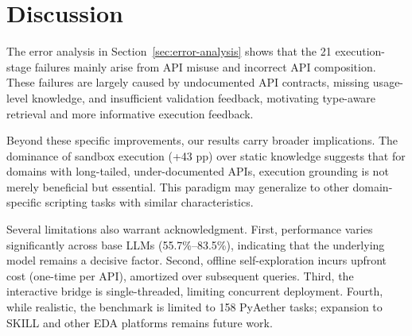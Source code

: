 \section{Discussion}
\label{sec:discussion}

The error analysis in Section~\ref{sec:error-analysis} shows that the 21 execution-stage failures mainly arise from API misuse and incorrect API composition. These failures are largely caused by undocumented API contracts, missing usage-level knowledge, and insufficient validation feedback, motivating type-aware retrieval and more informative execution feedback.

Beyond these specific improvements, our results carry broader implications. The dominance of sandbox execution (+43 pp) over static knowledge suggests that for domains with long-tailed, under-docu\-mented APIs, execution grounding is not merely beneficial but essential. This paradigm may generalize to other domain-specific scripting tasks with similar characteristics.

Several limitations also warrant acknowledgment. First, performance varies significantly across base LLMs (55.7\%–83.5\%), indicating that the underlying model remains a decisive factor. Second, offline self-exploration incurs upfront cost (one-time per API), amortized over subsequent queries. Third, the interactive bridge is single-threaded, limiting concurrent deployment. Fourth, while realistic, the benchmark is limited to 158 PyAether tasks; expansion to SKILL and other EDA platforms remains future work.

